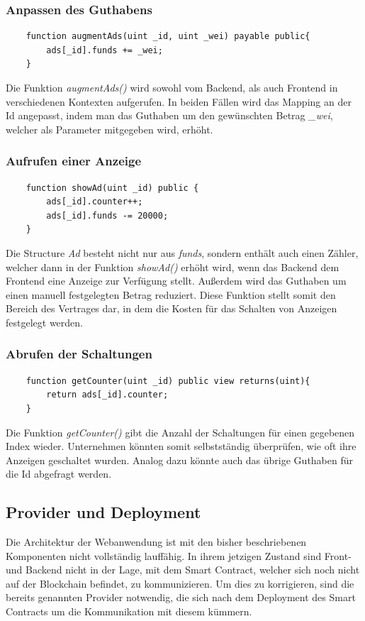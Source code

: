 \subsubsection{Anpassen des Guthabens}
\begin{lstlisting}
	function augmentAds(uint _id, uint _wei) payable public{
		ads[_id].funds += _wei;
	}
\end{lstlisting}
Die Funktion \emph{augmentAds()} wird sowohl vom Backend, als auch Frontend in verschiedenen Kontexten aufgerufen. In beiden Fällen wird das Mapping an der Id angepasst, indem man das Guthaben um den gewünschten Betrag \emph{\_wei}, welcher als Parameter mitgegeben wird, erhöht. 
\subsubsection{Aufrufen einer Anzeige}
\begin{lstlisting}
	function showAd(uint _id) public {
		ads[_id].counter++;
		ads[_id].funds -= 20000;
	}
\end{lstlisting}
Die Structure \emph{Ad} besteht nicht nur aus \emph{funds}, sondern enthält auch einen Zähler, welcher dann in der Funktion \emph{showAd()} erhöht wird, wenn das Backend dem Frontend eine Anzeige zur Verfügung stellt. Außerdem wird das Guthaben um einen manuell festgelegten Betrag reduziert. Diese Funktion stellt somit den Bereich des Vertrages dar, in dem die Kosten für das Schalten von Anzeigen festgelegt werden.
\subsubsection{Abrufen der Schaltungen}
\begin{lstlisting}
	function getCounter(uint _id) public view returns(uint){
		return ads[_id].counter;
	}
\end{lstlisting}
Die Funktion \emph{getCounter()} gibt die Anzahl der Schaltungen für einen gegebenen Index wieder. Unternehmen könnten somit selbstständig überprüfen, wie oft ihre Anzeigen geschaltet wurden. Analog dazu könnte auch das übrige Guthaben für die Id abgefragt werden. 
\subsection{Provider und Deployment}
Die Architektur der Webanwendung ist mit den bisher beschriebenen Komponenten nicht vollständig lauffähig. In ihrem jetzigen Zustand sind Front- und Backend nicht in der Lage, mit dem Smart Contract, welcher sich noch nicht auf der Blockchain befindet, zu kommunizieren. Um dies zu korrigieren, sind die bereits genannten Provider notwendig, die sich nach dem Deployment des Smart Contracts um die Kommunikation mit diesem kümmern.
